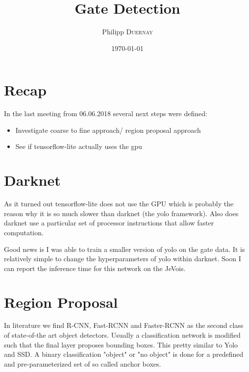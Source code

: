 \documentclass{article}
\title{Gate Detection} %
\author{Philipp \textsc{Duernay}} %
\date{\today} %
\begin{document}
\maketitle


\section{Recap}
In the last meeting from 06.06.2018 several next steps were defined:
\begin{itemize}
	\item Investigate coarse to fine approach/ region proposal approach
	\item See if tensorflow-lite actually uses the gpu
\end{itemize}


\section{Darknet}

As it turned out tensorflow-lite does not use the GPU which is probably the reason why it is so much slower than darknet (the yolo framework). Also does darknet use a particular set of processor instructions that allow faster computation.

Good news is I was able to train a smaller version of yolo on the gate data. It is relatively simple to change the hyperparameters of yolo within darknet. Soon I can report the inference time for this network on the JeVois.


\section{Region Proposal}

In literature we find R-CNN, Fast-RCNN and Faster-RCNN as the second class of state-of-the art object detectors. Usually a classification network is modified such that the final layer proposes bounding boxes. This pretty similar to Yolo and SSD. A binary classification "object" or "no object" is done for a predefined and pre-parameterized set of so called anchor boxes.
\end{document}

